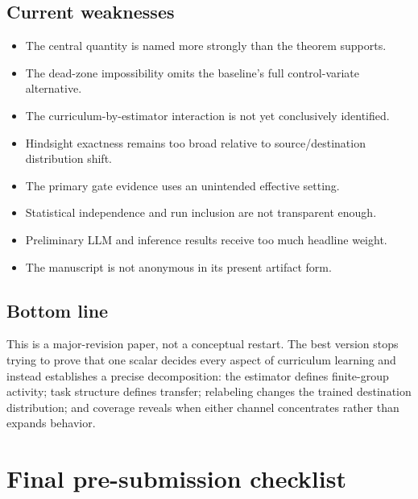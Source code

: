 \documentclass[11pt]{article}
\theoremstyle{definition}
\theoremstyle{remark}
\begin{document}
\subsection{Current weaknesses}

\begin{itemize}[leftmargin=2em]
\item The central quantity is named more strongly than the theorem supports.
\item The dead-zone impossibility omits the baseline's full control-variate alternative.
\item The curriculum-by-estimator interaction is not yet conclusively identified.
\item Hindsight exactness remains too broad relative to source/destination distribution shift.
\item The primary gate evidence uses an unintended effective setting.
\item Statistical independence and run inclusion are not transparent enough.
\item Preliminary LLM and inference results receive too much headline weight.
\item The manuscript is not anonymous in its present artifact form.
\end{itemize}

\subsection{Bottom line}

\begin{takeawaybox}
This is a major-revision paper, not a conceptual restart. The best version stops trying to prove that one scalar decides every aspect of curriculum learning and instead establishes a precise decomposition: the estimator defines finite-group activity; task structure defines transfer; relabeling changes the trained destination distribution; and coverage reveals when either channel concentrates rather than expands behavior.
\end{takeawaybox}

\section{Final pre-submission checklist}
\end{document}
